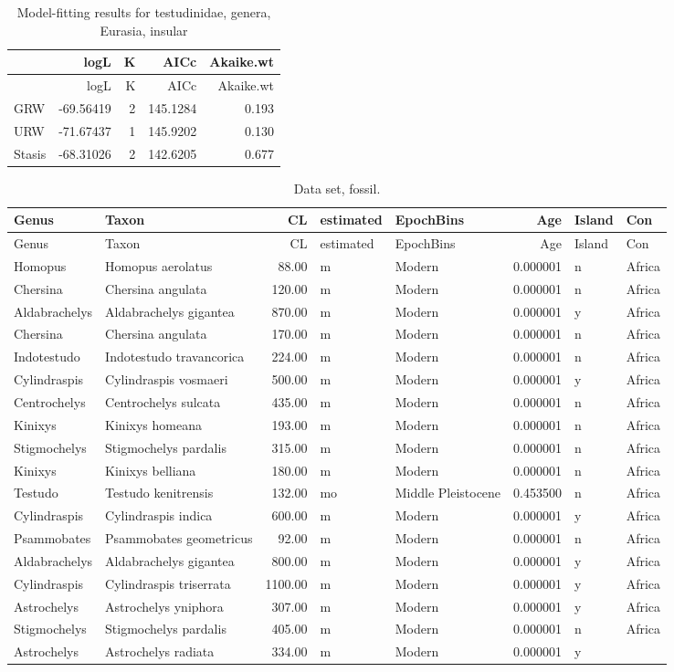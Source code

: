 \documentclass[]{article}
\begin{document}
\begin{longtable}[]{@{}lrrrr@{}}
\caption{Model-fitting results for testudinidae, genera, Eurasia,
insular}\tabularnewline
\toprule
& logL & K & AICc & Akaike.wt\tabularnewline
\midrule
\endfirsthead
\toprule
& logL & K & AICc & Akaike.wt\tabularnewline
\midrule
\endhead
GRW & -69.56419 & 2 & 145.1284 & 0.193\tabularnewline
URW & -71.67437 & 1 & 145.9202 & 0.130\tabularnewline
Stasis & -68.31026 & 2 & 142.6205 & 0.677\tabularnewline
\bottomrule
\end{longtable}

\begin{longtable}[]{@{}llrllrll@{}}
\caption{Data set, fossil.}\tabularnewline
\toprule
Genus & Taxon & CL & estimated & EpochBins & Age & Island &
Con\tabularnewline
\midrule
\endfirsthead
\toprule
Genus & Taxon & CL & estimated & EpochBins & Age & Island &
Con\tabularnewline
\midrule
\endhead
Homopus & Homopus aerolatus & 88.00 & m & Modern & 0.000001 & n &
Africa\tabularnewline
Chersina & Chersina angulata & 120.00 & m & Modern & 0.000001 & n &
Africa\tabularnewline
Aldabrachelys & Aldabrachelys gigantea & 870.00 & m & Modern & 0.000001
& y & Africa\tabularnewline
Chersina & Chersina angulata & 170.00 & m & Modern & 0.000001 & n &
Africa\tabularnewline
Indotestudo & Indotestudo travancorica & 224.00 & m & Modern & 0.000001
& n & Africa\tabularnewline
Cylindraspis & Cylindraspis vosmaeri & 500.00 & m & Modern & 0.000001 &
y & Africa\tabularnewline
Centrochelys & Centrochelys sulcata & 435.00 & m & Modern & 0.000001 & n
& Africa\tabularnewline
Kinixys & Kinixys homeana & 193.00 & m & Modern & 0.000001 & n &
Africa\tabularnewline
Stigmochelys & Stigmochelys pardalis & 315.00 & m & Modern & 0.000001 &
n & Africa\tabularnewline
Kinixys & Kinixys belliana & 180.00 & m & Modern & 0.000001 & n &
Africa\tabularnewline
Testudo & Testudo kenitrensis & 132.00 & mo & Middle Pleistocene &
0.453500 & n & Africa\tabularnewline
Cylindraspis & Cylindraspis indica & 600.00 & m & Modern & 0.000001 & y
& Africa\tabularnewline
Psammobates & Psammobates geometricus & 92.00 & m & Modern & 0.000001 &
n & Africa\tabularnewline
Aldabrachelys & Aldabrachelys gigantea & 800.00 & m & Modern & 0.000001
& y & Africa\tabularnewline
Cylindraspis & Cylindraspis triserrata & 1100.00 & m & Modern & 0.000001
& y & Africa\tabularnewline
Astrochelys & Astrochelys yniphora & 307.00 & m & Modern & 0.000001 & y
& Africa\tabularnewline
Stigmochelys & Stigmochelys pardalis & 405.00 & m & Modern & 0.000001 &
n & Africa\tabularnewline
Astrochelys & Astrochelys radiata & 334.00 & m & Modern & 0.000001 & y &

\end{longtable}
\end{document}
